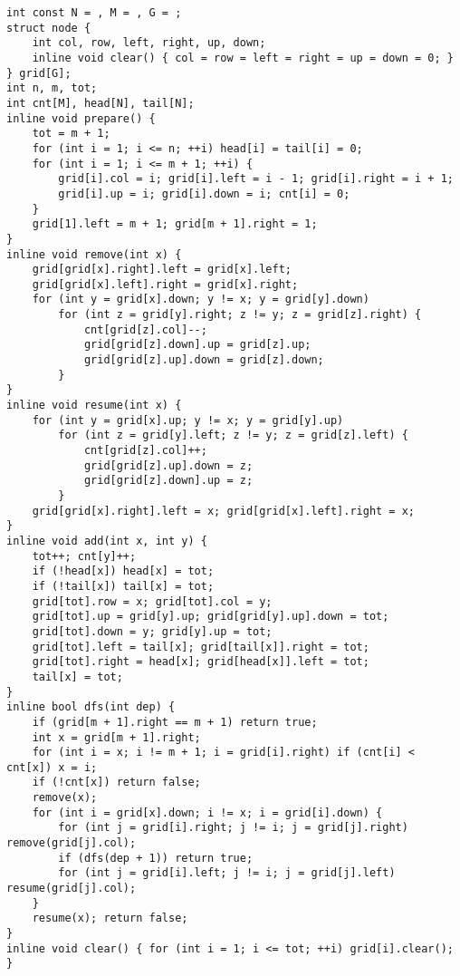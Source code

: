 \begin{lstlisting}
int const N = , M = , G = ;
struct node {
	int col, row, left, right, up, down;
	inline void clear() { col = row = left = right = up = down = 0; }
} grid[G];
int n, m, tot;
int cnt[M], head[N], tail[N];
inline void prepare() {
	tot = m + 1;
	for (int i = 1; i <= n; ++i) head[i] = tail[i] = 0;
	for (int i = 1; i <= m + 1; ++i) {
		grid[i].col = i; grid[i].left = i - 1; grid[i].right = i + 1;
		grid[i].up = i; grid[i].down = i; cnt[i] = 0;
	}
	grid[1].left = m + 1; grid[m + 1].right = 1;
}
inline void remove(int x) {
	grid[grid[x].right].left = grid[x].left;
	grid[grid[x].left].right = grid[x].right;
	for (int y = grid[x].down; y != x; y = grid[y].down)
		for (int z = grid[y].right; z != y; z = grid[z].right) {
			cnt[grid[z].col]--;
			grid[grid[z].down].up = grid[z].up;
			grid[grid[z].up].down = grid[z].down;
		}
}
inline void resume(int x) {
	for (int y = grid[x].up; y != x; y = grid[y].up)
		for (int z = grid[y].left; z != y; z = grid[z].left) {
			cnt[grid[z].col]++;
			grid[grid[z].up].down = z;
			grid[grid[z].down].up = z;
		}
	grid[grid[x].right].left = x; grid[grid[x].left].right = x;
}
inline void add(int x, int y) {
	tot++; cnt[y]++;
	if (!head[x]) head[x] = tot;
	if (!tail[x]) tail[x] = tot;
	grid[tot].row = x; grid[tot].col = y;
	grid[tot].up = grid[y].up; grid[grid[y].up].down = tot;
	grid[tot].down = y; grid[y].up = tot;
	grid[tot].left = tail[x]; grid[tail[x]].right = tot;
	grid[tot].right = head[x]; grid[head[x]].left = tot;
	tail[x] = tot;
}
inline bool dfs(int dep) {
	if (grid[m + 1].right == m + 1) return true;
	int x = grid[m + 1].right;
	for (int i = x; i != m + 1; i = grid[i].right) if (cnt[i] < cnt[x]) x = i;
	if (!cnt[x]) return false;
	remove(x);
	for (int i = grid[x].down; i != x; i = grid[i].down) {
		for (int j = grid[i].right; j != i; j = grid[j].right) remove(grid[j].col);
		if (dfs(dep + 1)) return true;
		for (int j = grid[i].left; j != i; j = grid[j].left) resume(grid[j].col);
	}
	resume(x); return false;
}
inline void clear() { for (int i = 1; i <= tot; ++i) grid[i].clear(); }
\end{lstlisting}